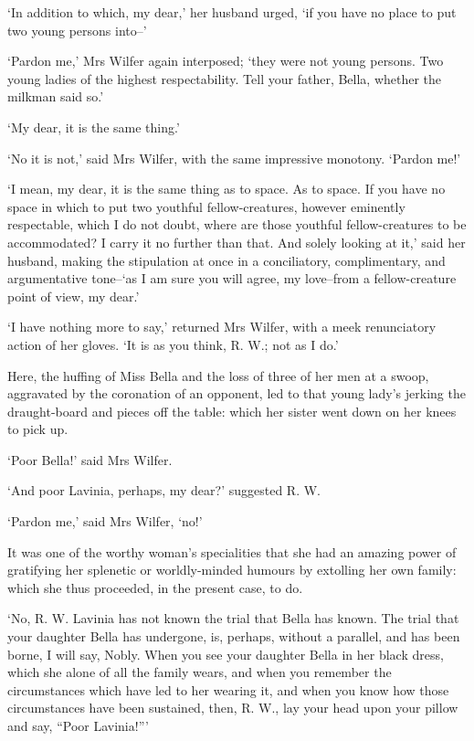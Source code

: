 ‘In addition to which, my dear,’ her husband urged, ‘if you have no
place to put two young persons into--’

‘Pardon me,’ Mrs Wilfer again interposed; ‘they were not young persons.
Two young ladies of the highest respectability. Tell your father, Bella,
whether the milkman said so.’

‘My dear, it is the same thing.’

‘No it is not,’ said Mrs Wilfer, with the same impressive monotony.
‘Pardon me!’

‘I mean, my dear, it is the same thing as to space. As to space. If you
have no space in which to put two youthful fellow-creatures, however
eminently respectable, which I do not doubt, where are those youthful
fellow-creatures to be accommodated? I carry it no further than that.
And solely looking at it,’ said her husband, making the stipulation at
once in a conciliatory, complimentary, and argumentative tone--‘as I am
sure you will agree, my love--from a fellow-creature point of view, my
dear.’

‘I have nothing more to say,’ returned Mrs Wilfer, with a meek
renunciatory action of her gloves. ‘It is as you think, R. W.; not as I
do.’

Here, the huffing of Miss Bella and the loss of three of her men at a
swoop, aggravated by the coronation of an opponent, led to that young
lady’s jerking the draught-board and pieces off the table: which her
sister went down on her knees to pick up.

‘Poor Bella!’ said Mrs Wilfer.

‘And poor Lavinia, perhaps, my dear?’ suggested R. W.

‘Pardon me,’ said Mrs Wilfer, ‘no!’

It was one of the worthy woman’s specialities that she had an amazing
power of gratifying her splenetic or worldly-minded humours by extolling
her own family: which she thus proceeded, in the present case, to do.

‘No, R. W. Lavinia has not known the trial that Bella has known. The
trial that your daughter Bella has undergone, is, perhaps, without
a parallel, and has been borne, I will say, Nobly. When you see your
daughter Bella in her black dress, which she alone of all the family
wears, and when you remember the circumstances which have led to
her wearing it, and when you know how those circumstances have been
sustained, then, R. W., lay your head upon your pillow and say, “Poor
Lavinia!”’

